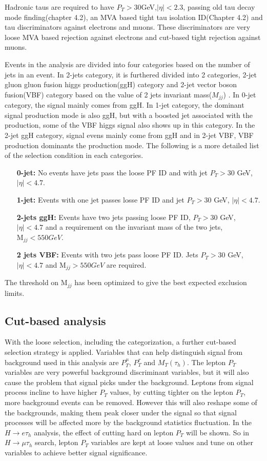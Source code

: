 Hadronic taus are required to have $P_T>30$GeV,$|\eta|<2.3$, passing old tau decay mode finding(chapter 4.2), an MVA based tight tau isolation ID(Chapter 4.2) and tau discriminators against electrons and muons. These discriminators are very loose MVA based rejection against electrons and cut-based tight rejection against muons.  



Events in the analysis are divided into four categories based on the number of jets in an event. In 2-jets category, it is furthered divided into 2 categories,  2-jet gluon gluon fusion higgs production(ggH) category and 2-jet vector boson fusion(VBF) category based on the value of 2 jets invariant mass($M_{jj}$) . In 0-jet category, the signal mainly comes from ggH. In 1-jet category, the dominant signal production mode is also ggH, but with a boosted jet associated with the production, some of the VBF higgs signal also shows up in this category. In the 2-jet ggH category, signal evens mainly come from ggH and in 2-jet VBF, VBF production dominants the production mode.  The following is a more detailed list of the selection condition in each categories.

\begin{enumerate}
\item[{\bf 0-jet:}] No events have jets pass the loose PF ID and  with jet $P_T>30$ GeV, $|\eta|<4.7$.
\item[{\bf 1-jet:}] Events with one jet passes losse PF ID and jet $P_T>30$ GeV, $|\eta|<4.7$.
\item [{\bf 2-jets ggH:}] Events have two jets passing loose PF ID, $P_T>30$ GeV, $|\eta|<4.7$ and a requirement on the invariant mass of the two jets, $\textrm{M}_{jj}<550GeV$. 
\item [{\bf 2 jets VBF:}] Events with two jets pass loose PF ID. Jets $P_T>30$ GeV, $|\eta|<4.7$ and $\textrm{M}_{jj}>550 GeV$ are required. 
\end{enumerate} The threshold on $\textrm{M}_{jj}$ has been optimized to give the best expected exclusion limits.


\subsection{Cut-based analysis}
With the loose selection, including the categorization, a further cut-based selection strategy is applied. Variables that can help distinguish signal from background used in this analysis are $P_{T}^{\mu}$, $P_{T}^{\tau}$ and $M_{T}(\tau_{h})$. The lepton $P_{T}$ variables are very powerful background discriminant variables, but it will also cause the problem that signal picks under the background. Leptons from signal process  incline to have higher $P_{T}$ values, by cutting tighter on the lepton $P_{T}$, more background events can be removed. However this will also reshape some of the backgrounds, making them peak closer under the signal so that signal processes will be affected more by the background statistics fluctuation. In the $H\rightarrow e\tau_h$ analysis, the effect of cutting hard on lepton $P_{T}$ will be shown. So in $H\rightarrow\mu\tau_h$ search, lepton $P_{T}$ variables are kept at loose values and tune on other variables to achieve better signal significance. 

